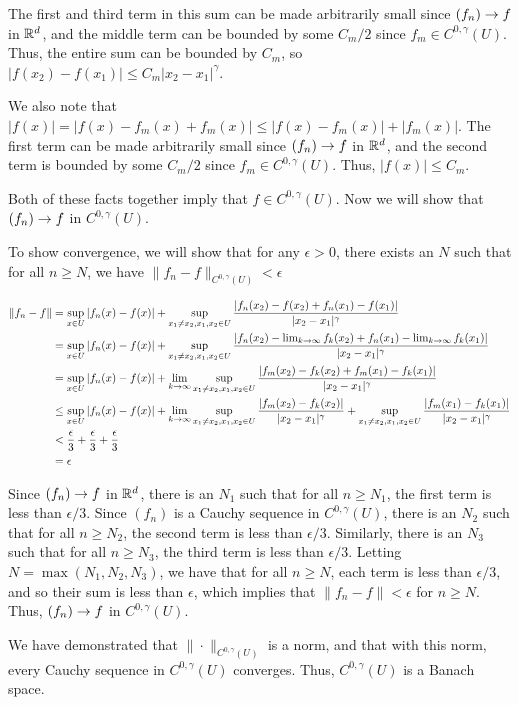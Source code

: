 \documentclass{hmwk}
\begin{document}
\begin{solution}
\pre The first and third term in this sum can be made arbitrarily small since $(f_n) \rightarrow f$ in $\mathbb{R}^d$, and the middle term can be bounded by some $C_m/2$ since $f_m \in C^{0, \gamma}(U)$. Thus, the entire sum can be bounded by $C_m$, so $|f(x_2) - f(x_1)| \leq C_m|x_2 - x_1|^\gamma$. 

\pre We also note that $|f(x)| = |f(x) - f_m(x) + f_m(x)| \leq |f(x) - f_m(x)| + |f_m(x)|$. The first term can be made arbitrarily small since $(f_n) \rightarrow f$ in $\mathbb{R}^d$, and the second term is bounded by some $C_m/2$ since $f_m \in C^{0, \gamma}(U)$. Thus, $|f(x)| \leq C_m$. 

\pre Both of these facts together imply that $f \in C^{0, \gamma}(U)$. Now we will show that $(f_n) \rightarrow f$ in $C^{0, \gamma}(U)$. 

\pre To show convergence, we will show that for any $\epsilon > 0$, there exists an $N$ such that for all $n \geq N$, we have $\|f_n - f\|_{C^{0, \gamma}(U)} < \epsilon$

\begin{align*}
    \|f_n - f\| &= \sup_{x \in U}|f_n(x) - f(x)| + \sup_{x_1 \neq x_2, x_1, x_2 \in U} \frac{|f_n(x_2) - f(x_2) + f_n(x_1) - f(x_1)|}{|x_2 - x_1|^\gamma} \\
    &= \sup_{x \in U}|f_n(x) - f(x)| + \sup_{x_1 \neq x_2, x_1, x_2 \in U} \frac{|f_n(x_2) - \lim_{k\rightarrow\infty}f_k(x_2) + f_n(x_1) - \lim_{k\rightarrow\infty}f_k(x_1)|}{|x_2 - x_1|^\gamma} \\
    &= \sup_{x \in U}|f_n(x) - f(x)| + \lim_{k \rightarrow\infty} \sup_{x_1 \neq x_2, x_1, x_2 \in U} \frac{|f_m(x_2) - f_k(x_2) + f_m(x_1) - f_k(x_1)|}{|x_2 - x_1|^\gamma} \\
    &\leq \sup_{x \in U}|f_n(x) - f(x)| + \lim_{k \rightarrow\infty} \sup_{x_1 \neq x_2, x_1, x_2 \in U} \frac{|f_m(x_2) - f_k(x_2)|}{|x_2 - x_1|^\gamma} + \sup_{x_1 \neq x_2, x_1, x_2 \in U} \frac{|f_m(x_1) - f_k(x_1)|}{|x_2 - x_1|^\gamma} \\
    &< \frac{\epsilon}{3} + \frac{\epsilon}{3} + \frac{\epsilon}{3} \\
    &= \epsilon
\end{align*}

\pre Since $(f_n) \rightarrow f$ in $\mathbb{R}^d$, there is an $N_1$ such that for all $n \geq N_1$, the first term is less than $\epsilon/3$. Since $(f_n)$ is a Cauchy sequence in $C^{0, \gamma}(U)$, there is an $N_2$ such that for all $n \geq N_2$, the second term is less than $\epsilon/3$. Similarly, there is an $N_3$ such that for all $n \geq N_3$, the third term is less than $\epsilon/3$. Letting $N = \max(N_1, N_2, N_3)$, we have that for all $n \geq N$, each term is less than $\epsilon/3$, and so their sum is less than $\epsilon$, which implies that $\|f_n - f\| < \epsilon$ for $n \geq N$. Thus, $(f_n) \rightarrow f$ in $C^{0, \gamma}(U)$.

\pre We have demonstrated that $\|\cdot\|_{C^{0, \gamma}(U)}$ is a norm, and that with this norm, every Cauchy sequence in $C^{0, \gamma}(U)$ converges. Thus, $C^{0, \gamma}(U)$ is a Banach space. 
\end{solution}
\end{document}
